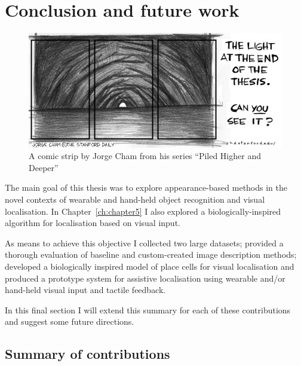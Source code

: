 \chapter{Conclusion and future work}\label{ch:conclusion}

\begin{figure}[h!]
\centering
\includegraphics[width=.8\textwidth]{./gfx/Chapter07/phd051700s.jpg}
\caption{A  comic strip by Jorge Cham from his series ``Piled Higher and Deeper'' \cite{Cham}}
\end{figure}

The main goal of this thesis was to explore appearance-based methods in the novel contexts of wearable and hand-held object recognition and visual localisation. In Chapter~\ref{ch:chapter5} I also explored a biologically-inspired algorithm for localisation based on visual input.

As means to achieve this objective I collected two large da\-ta\-sets; provided a thorough evaluation of baseline and custom-created image description methods; developed a biologically inspired model of place cells for visual localisation and produced a prototype system for assistive localisation using wearable and/or hand-held visual input and tactile feedback.

In this final section I will extend this summary for each of these contributions and suggest some future directions.

\section{Summary of contributions}

